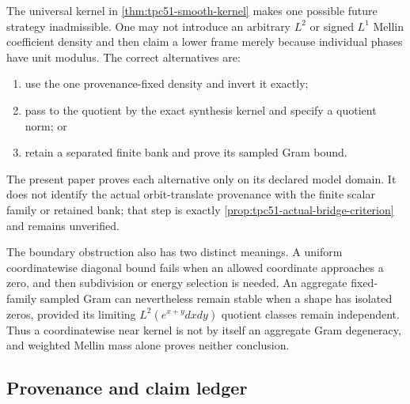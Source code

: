 The universal kernel in \cref{thm:tpc51-smooth-kernel} makes one
possible future strategy inadmissible.  One may not introduce an
arbitrary \(L^2\) or signed \(L^1\) Mellin coefficient density and then
claim a lower frame merely because individual phases have unit modulus.
The correct alternatives are:
\begin{enumerate}[label=\textup{(\alph*)},leftmargin=2.6em]
 \item use the one provenance-fixed density and invert it exactly;
 \item pass to the quotient by the exact synthesis kernel and specify a
       quotient norm; or
 \item retain a separated finite bank and prove its sampled Gram bound.
\end{enumerate}
The present paper proves each alternative only on its declared model
domain.  It does not identify the actual orbit-translate provenance
with the finite scalar family or retained bank; that step is exactly
\cref{prop:tpc51-actual-bridge-criterion} and remains unverified.

The boundary obstruction also has two distinct meanings.  A uniform
coordinatewise diagonal bound fails when an allowed coordinate
approaches a zero, and then subdivision or energy selection is needed.
An aggregate fixed-family sampled Gram can nevertheless remain stable
when a shape has isolated zeros, provided its limiting
\(L^2(e^{x+y}dxdy)\) quotient classes remain independent.  Thus a
coordinatewise near kernel is not by itself an aggregate Gram
degeneracy, and weighted Mellin mass alone proves neither conclusion.

\subsection{Provenance and claim ledger}

